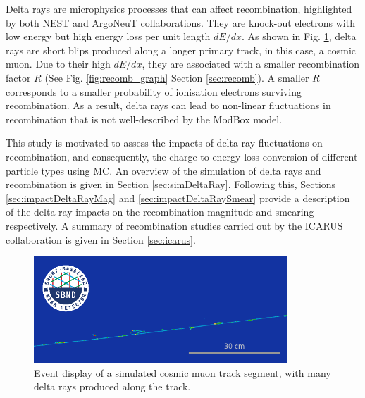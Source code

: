 
Delta rays are microphysics processes that can affect recombination, highlighted by both NEST \cite{NEST} and ArgoNeuT \cite{argoneut_recomb} collaborations.
They are knock-out electrons with low energy but high energy loss per unit length $dE/dx$.
As shown in Fig. \ref{fig:delta_ray_evd}, delta rays are short blips produced along a longer primary track, in this case, a cosmic muon.                      
Due to their high $dE/dx$, they are associated with a smaller recombination factor $R$ (See Fig. \ref{fig:recomb_graph} Section \ref{sec:recomb}).
A smaller $R$ corresponds to a smaller probability of ionisation electrons surviving recombination.
As a result, delta rays can lead to non-linear fluctuations in recombination that is not well-described by the ModBox model.

This study is motivated to assess the impacts of delta ray fluctuations on recombination, and consequently, the charge to energy loss conversion of different particle types using MC.
An overview of the simulation of delta rays and recombination is given in Section \ref{sec:simDeltaRay}.%
Following this, Sections \ref{sec:impactDeltaRayMag} and \ref{sec:impactDeltaRaySmear} provide a description of the delta ray impacts on the recombination magnitude and smearing respectively.
A summary of recombination studies carried out by the ICARUS collaboration is given in Section \ref{sec:icarus}.

\begin{figure}[hb!] 
\centering    
\includegraphics[width=0.85\textwidth]{delta_ray_evd}
\caption[Event Display of a Cosmic Muon and Delta Rays]{
Event display of a simulated cosmic muon track segment, with many delta rays produced along the track.
}
\label{fig:delta_ray_evd}
\end{figure}

